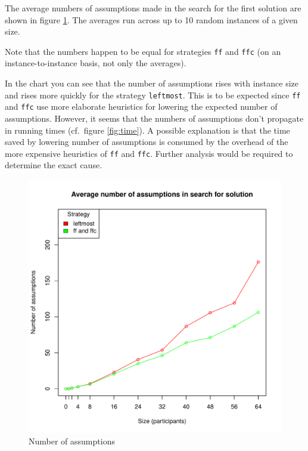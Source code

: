 \documentclass{article}
\newcommand{\code}[1]{\texttt{#1}}
\begin{document}
The average numbers of assumptions made in the search for the first solution
are shown in figure \ref{fig:assumptions}.
The averages run across up to 10 random instances of a given size.

Note that the numbers happen to be equal for strategies \code{ff} and \code{ffc}
(on an instance-to-instance basis, not only the averages).

In the chart you can see that the number of assumptions rises with instance size
and rises more quickly for the strategy \code{leftmost}.
This is to be expected since \code{ff} and \code{ffc} use more elaborate heuristics
for lowering the expected number of assumptions.
However, it seems that the numbers of assumptions don't propagate in running times
(cf.~figure \ref{fig:time}).
A possible explanation is that the time saved by lowering number of assumptions
is consumed by the overhead of the more expensive heuristics
of \code{ff} and \code{ffc}.
Further analysis would be required to determine the exact cause.

\begin{figure}
\centering
\includegraphics[width=\linewidth]{assumptions}
\caption{Number of assumptions}
\label{fig:assumptions}
\end{figure}
\end{document}
